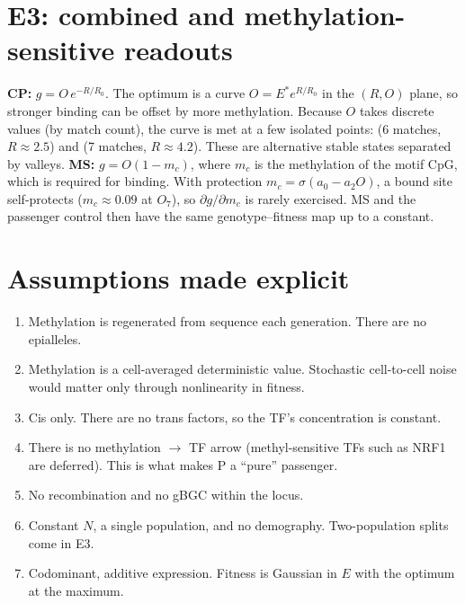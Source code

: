 \documentclass[11pt]{article}
\theoremstyle{definition}
\begin{document}
\section{E3: combined and methylation-sensitive readouts}\label{sec:e3}
\textbf{CP:} $g=O\,e^{-R/R_0}$. The optimum is a curve $O=E^*e^{R/R_0}$ in the $(R,O)$ plane, so stronger
binding can be offset by more methylation. Because $O$ takes discrete values (by match count), the curve is met
at a few isolated points: (6 matches, $R\approx2.5$) and (7 matches, $R\approx4.2$). These are alternative stable
states separated by valleys.
\textbf{MS:} $g=O(1-m_c)$, where $m_c$ is the methylation of the motif CpG, which is required for binding. With
protection $m_c=\sigma(a_0-a_2O)$, a bound site self-protects ($m_c\approx0.09$ at $O_7$), so
$\partial g/\partial m_c$ is rarely exercised. MS and the passenger control then have the same genotype--fitness map
up to a constant.

\section{Assumptions made explicit}
\begin{enumerate}
\item Methylation is regenerated from sequence each generation. There are no epialleles.
\item Methylation is a cell-averaged deterministic value. Stochastic cell-to-cell noise would matter only through
  nonlinearity in fitness.
\item Cis only. There are no trans factors, so the TF's concentration is constant.
\item There is no methylation $\to$ TF arrow (methyl-sensitive TFs such as NRF1 are deferred). This is what makes P a
  ``pure'' passenger.
\item No recombination and no gBGC within the locus.
\item Constant $N$, a single population, and no demography. Two-population splits come in E3.
\item Codominant, additive expression. Fitness is Gaussian in $E$ with the optimum at the maximum.
\end{enumerate}
\end{document}
